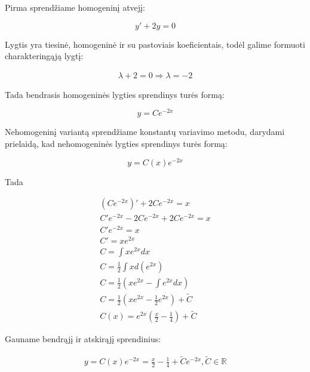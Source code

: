 \documentclass[11pt]{article}
\begin{document}
Pirma sprendžiame homogeninį atvejį:

\begin{equation}
y'+2y=0
\end{equation}

Lygtis yra tiesinė, homogeninė ir su pastoviais koeficientais, todėl galime formuoti charakteringąją lygtį:

\begin{equation}
\begin{split}
\lambda+2=0 \Rightarrow \lambda=-2
\end{split}
\end{equation}

Tada bendrasis homogeninės lygties sprendinys turės formą:

\begin{equation}
y=Ce^{-2x}
\end{equation}

Nehomogeninį variantą sprendžiame konstantų variavimo metodu, darydami prielaidą, kad nehomogeninės lygties sprendinys turės formą:

\begin{equation}
    y = C(x)e^{-2x}
\end{equation}

Tada

\begin{equation}
\begin{split}
(Ce^{-2x})'+2Ce^{-2x}=x\\
C'e^{-2x}-2Ce^{-2x}+2Ce^{-2x}=x\\
C'e^{-2x}=x\\
C'=xe^{2x}\\
C=\int xe^{2x}dx\\
C=\frac{1}{2}\int xd(e^{2x})\\
C=\frac{1}{2}\left(xe^{2x}-\int e^{2x}dx\right)\\
C=\frac{1}{2}\left(xe^{2x}-\frac{1}{2}e^{2x}\right)+\widetilde{C}\\
C(x)=e^{2x}\left(\frac{x}{2}-\frac{1}{4}\right)+\widetilde{C}
\end{split}
\end{equation}

\newpage

Gauname bendrąjį ir atskirąjį sprendinius:

\begin{equation}
\begin{split}
y=C(x)e^{-2x}=\frac{x}{2}-\frac{1}{4}+\widetilde{C}e^{-2x},\widetilde{C}\in\mathbb{R}
\end{split}
\end{equation}
\end{document}
